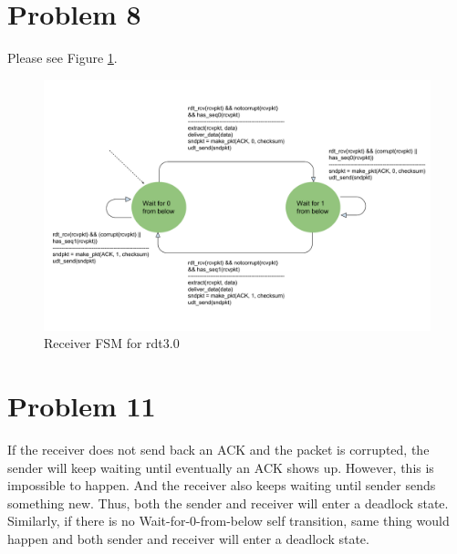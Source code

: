 \documentclass[titlepage, paper=a4, fontsize=11pt]{scrartcl} %
\numberwithin{equation}{section} %
\numberwithin{table}{section} %
\begin{document}
\section*{Problem 8}
Please see Figure \ref{fig:rdt3}.
\begin{figure}[!ht]
    \includegraphics[width=\textwidth]{images/rdt3-rcv-FSM.pdf}
    \caption{Receiver FSM for rdt3.0}
    \label{fig:rdt3}
\end{figure}




\section*{Problem 11}
If the receiver does not send back an ACK and the packet is corrupted, the sender will keep waiting until eventually an ACK shows up.
However, this is impossible to happen. And the receiver also keeps waiting until sender sends something
new. Thus, both the sender and receiver will enter a deadlock state. \\

Similarly, if there is no Wait-for-0-from-below self transition, same thing would happen and both sender
and receiver will enter a deadlock state.
\\

\newpage

\end{document}
